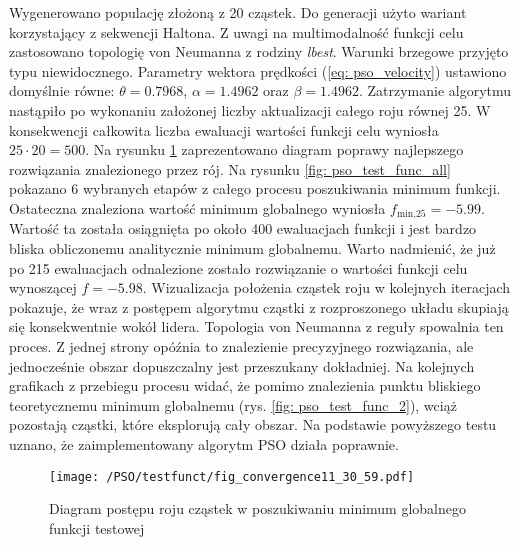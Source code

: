 Wygenerowano populację złożoną z 20 cząstek. Do generacji użyto wariant korzystający z sekwencji Haltona. Z uwagi na multimodalność funkcji celu zastosowano topologię von Neumanna z rodziny \textit{lbest}. Warunki brzegowe przyjęto typu niewidocznego. Parametry wektora prędkości (\ref{eq: pso_velocity}) ustawiono domyślnie równe: $\theta=0.7968$, $\alpha=1.4962$ oraz $\beta=1.4962$. Zatrzymanie algorytmu nastąpiło po wykonaniu założonej liczby aktualizacji całego roju równej 25. W konsekwencji całkowita liczba ewaluacji wartości funkcji celu wyniosła $25\cdot20=500$. Na rysunku \ref{fig: pso_convergence_plot} zaprezentowano diagram poprawy najlepszego rozwiązania znalezionego przez rój. Na rysunku \ref{fig: pso_test_func_all} pokazano 6 wybranych etapów z całego procesu poszukiwania minimum funkcji. Ostateczna znaleziona wartość minimum globalnego wyniosła $f_{\text{min,25}}=-5.99$. Wartość ta została osiągnięta po około 400 ewaluacjach funkcji i jest bardzo bliska obliczonemu analitycznie minimum globalnemu. Warto nadmienić, że już po 215 ewaluacjach odnalezione zostało rozwiązanie o wartości funkcji celu wynoszącej $f=-5.98$. Wizualizacja położenia cząstek roju w kolejnych iteracjach pokazuje, że wraz z postępem algorytmu cząstki z rozproszonego układu skupiają się konsekwentnie wokół lidera. Topologia von Neumanna z reguły spowalnia ten proces. Z jednej strony opóźnia to znalezienie precyzyjnego rozwiązania, ale jednocześnie obszar dopuszczalny jest przeszukany dokładniej. Na kolejnych grafikach z przebiegu procesu widać, że pomimo znalezienia punktu bliskiego teoretycznemu minimum globalnemu (rys. \ref{fig: pso_test_func_2}), wciąż pozostają cząstki, które eksplorują cały obszar. Na podstawie powyższego testu uznano, że zaimplementowany algorytm PSO działa poprawnie.
\begin{figure}[hbt!]
	\centering
	\texttt{[image: /PSO/testfunct/fig\_convergence11\_30\_59.pdf]} 
	\captionsetup{justification=centering}
	\caption{Diagram postępu roju cząstek w poszukiwaniu minimum globalnego funkcji testowej}
	\label{fig: pso_convergence_plot} 
\end{figure}


